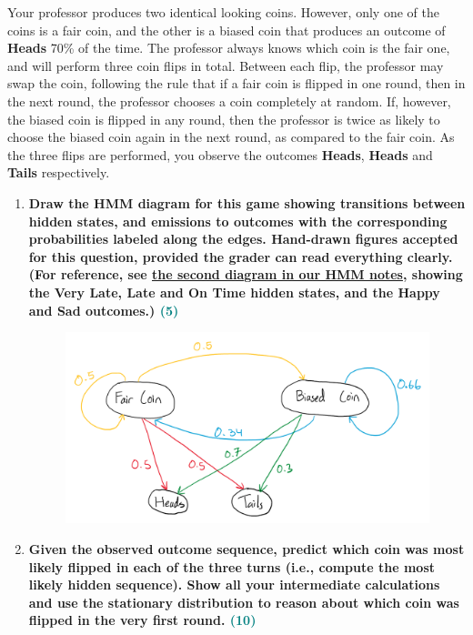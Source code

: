 \documentclass[a4paper]{article}
\begin{document}
\begin{sloppypar}
\noindent Your professor produces two identical looking coins. However, only one of the coins is a
fair coin, and the other is a biased coin that produces an outcome of \textbf{Heads} 70\% of the
time. The professor always knows which coin is the fair one, and will perform three coin
flips in total. Between each flip, the professor may swap the coin, following the rule that
if a fair coin is flipped in one round, then in the next round, the professor chooses a coin
completely at random. If, however, the biased coin is flipped in any round, then the professor 
is twice as likely to choose the biased coin again in the next round, as compared to
the fair coin. As the three flips are performed, you observe the outcomes \textbf{Heads}, \textbf{Heads}
and \textbf{Tails} respectively.


\begin{enumerate}[start=6,label=Q\arabic*,left=0pt]
    \item \textbf{Draw the HMM diagram for this game showing transitions between hidden states,
    and emissions to outcomes with the corresponding probabilities labeled along the edges.
    Hand-drawn figures accepted for this question, provided the grader can read everything
    clearly. (For reference, see \href{https://rajagopalvenkat.com/teaching/resources/AI/ch6.html\#hmm}{the second diagram in our HMM notes}, showing the Very Late,
    Late and On Time hidden states, and the Happy and Sad outcomes.) \hfill \textcolor{teal}{(5)}}

    \begin{figure}[H]
        \centering  
        \includegraphics[height=0.3\textheight]{Q6_hmm.png}
        \label{fig:Q6_hmm}
    \end{figure}

    \item \textbf{Given the observed outcome sequence, predict which coin was most likely flipped
    in each of the three turns (i.e., compute the most likely hidden sequence). Show all your
    intermediate calculations and use the stationary distribution to reason about which coin
    was flipped in the very first round. \hfill \textcolor{teal}{(10)}} \\


\end{enumerate}
\end{sloppypar}
\end{document}

